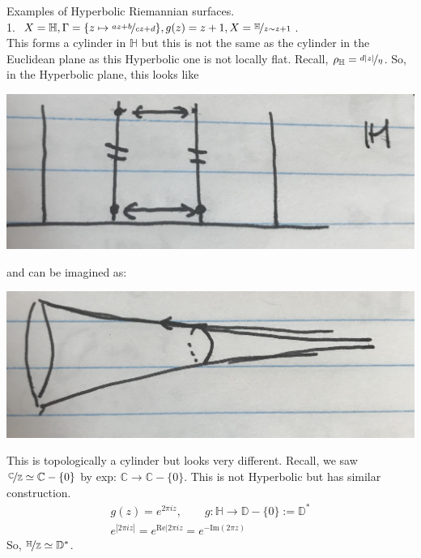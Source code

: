 \documentclass[a4paper, 11pt]{book}
\theoremstyle{definition}
\theoremstyle{remark}
\begin{document}
    Examples of Hyperbolic Riemannian surfaces.\\

    1. $X=\mathbb{H},\Gamma = \{z\mapsto \nicefrac{az+b}{cz+d}\}, g(z) = z+1, X = \nicefrac{\mathbb{H}}{z\sim z+1}$.\\
    This forms a cylinder in $\mathbb{H}$ but this is not the same as the cylinder in the Euclidean plane as this Hyperbolic
    one is not locally flat. Recall, $\rho_{\mathbb{H}} = \nicefrac{d|z|}{\eta}$. So, in the Hyperbolic plane, this looks like
    \begin{center}
        \includegraphics[scale=0.05]{IMG_1017}
    \end{center}
    and can be imagined as:
    \begin{center}
        \includegraphics[scale=0.05]{IMG_1018}
    \end{center}
    This is topologically a cylinder but looks very different. Recall, we saw $\nicefrac{\mathbb{C}}{\mathbb{Z}}\simeq\mathbb{C}-\{0\}$
    by exp: $\mathbb{C}\to\mathbb{C}-\{0\}$. This is not Hyperbolic but has similar construction.
    \begin{align*}
        g(z) = e^{2\pi iz},\qquad g:\mathbb{H}\to\mathbb{D}-\{0\} := \mathbb{D}^* \\
        e^{|2\pi iz|} = e^{\text{Re}|2\pi iz} = e^{-\text{Im}(2\pi z)}
    \end{align*}
    So, $\nicefrac{\mathbb{H}}{\mathbb{Z}} \simeq \mathbb{D}^*$.\\
\end{document}
